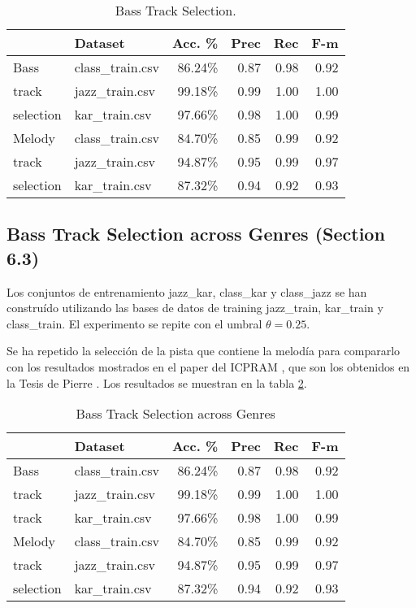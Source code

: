 \documentclass{article}
\begin{document}
\begin{table}
\begin{center}
\begin{tabular}{  l | l | r | r | r | r }
\hline
 & Dataset & Acc. \% & Prec & Rec & F-m \\
\hline
\hline
Bass   & class\_train.csv & 86.24\% & 0.87 & 0.98 & 0.92 \\
track & jazz\_train.csv & 99.18\% & 0.99 & 1.00 & 1.00 \\
selection & kar\_train.csv & 97.66\% & 0.98 & 1.00 & 0.99 \\
\hline
Melody   & class\_train.csv & 84.70\% & 0.85 & 0.99 & 0.92 \\
track & jazz\_train.csv & 94.87\% & 0.95 & 0.99 & 0.97 \\
selection & kar\_train.csv & 87.32\% & 0.94 & 0.92 & 0.93 \\
\hline
\end{tabular}
\caption{Bass Track Selection.}
\label{table8}
\end{center}
\end{table}





\subsection{Bass Track Selection across Genres (Section 6.3)}

Los conjuntos de entrenamiento jazz\_kar, class\_kar y class\_jazz se han construído utilizando las bases de datos de training jazz\_train, kar\_train y class\_train. El experimento se repite con  el umbral $\theta=0.25$.

Se ha repetido la selección de la pista que contiene la melodía para compararlo con los resultados mostrados en el paper del ICPRAM \cite{vicente2012bass}, que son los obtenidos en la Tesis de Pierre \cite{de2011statistical}. Los resultados se muestran en la tabla \ref{table9}.

\begin{table}
\begin{center}
\begin{tabular}{  l | l | r | r | r | r }
\hline
 & Dataset & Acc. \% & Prec & Rec & F-m \\
\hline
\hline
Bass & class\_train.csv & 86.24\% & 0.87 & 0.98 & 0.92 \\
track & jazz\_train.csv & 99.18\% & 0.99 & 1.00 & 1.00 \\
track & kar\_train.csv & 97.66\% & 0.98 & 1.00 & 0.99 \\
\hline
Melody & class\_train.csv & 84.70\% & 0.85 & 0.99 & 0.92 \\
track & jazz\_train.csv & 94.87\% & 0.95 & 0.99 & 0.97 \\
selection & kar\_train.csv & 87.32\% & 0.94 & 0.92 & 0.93 \\
\hline
\end{tabular}
\caption{Bass Track Selection across Genres}
\label{table9}
\end{center}
\end{table}
\end{document}
